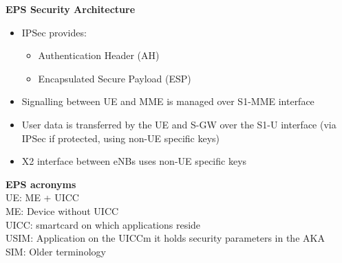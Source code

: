 \documentclass[10pt,letterpaper,landscape]{report}
\newcommand{\boxheight}{21.59cm}
\newcommand{\boxwidth}{8.85cm}
\begin{document}
\begin{small}
{\begin{minipage}[t][\boxheight][c]{\boxwidth}
    \textbf{EPS Security Architecture}
    \begin{itemize}
        \item IPSec provides:
        \begin{itemize}
            \item Authentication Header (AH)
            \item Encapsulated Secure Payload (ESP)
        \end{itemize}
        \item Signalling between UE and MME is managed over S1-MME interface
        \item User data is transferred by the UE and S-GW over the S1-U interface (via IPSec if protected, using non-UE specific keys)
        \item X2 interface between eNBs uses non-UE specific keys
    \end{itemize}
    
    \textbf{EPS acronyms}\\
    UE: ME + UICC\\
    ME: Device without UICC\\
    UICC: smartcard on which applications reside\\
    USIM: Application on the UICCm it holds security parameters in the AKA\\
    SIM: Older terminology

    
    

\end{minipage}
}\fbox{
\begin{minipage}[t][\boxheight][c]{\boxwidth}

    TODO


\end{minipage}
}
\end{small}
\end{document}
